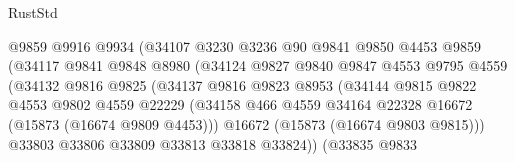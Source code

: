 \begin{lexlean}{RustStd}
\begin{coremodule}
                                  @9859
                                  @9916
                                  @9934
                                  (@34107
                                    @3230
                                    @3236
                                    @90
                                    @9841
                                    @9850
                                    @4453
                                    @9859
                                    (@34117
                                      @9841
                                      @9848
                                      @8980
                                      (@34124
                                        @9827
                                        @9840
                                        @9847
                                        @4553
                                        @9795
                                        @4559
                                        (@34132
                                          @9816
                                          @9825
                                          (@34137
                                            @9816
                                            @9823
                                            @8953
                                            (@34144
                                              @9815
                                              @9822
                                              @4553
                                              @9802
                                              @4559
                                              @22229
                                              (@34158
                                                @466
                                                @4559
                                                @34164
                                                @22328
                                                @16672
                                                (@15873 (@16674 @9809 @4453)))
                                              @16672
                                              (@15873 (@16674 @9803 @9815)))
                                            @33803
                                            @33806
                                            @33809
                                            @33813
                                            @33818
                                            @33824))
                                        (@33835
                                          @9833

\end{coremodule}
\end{lexlean}
